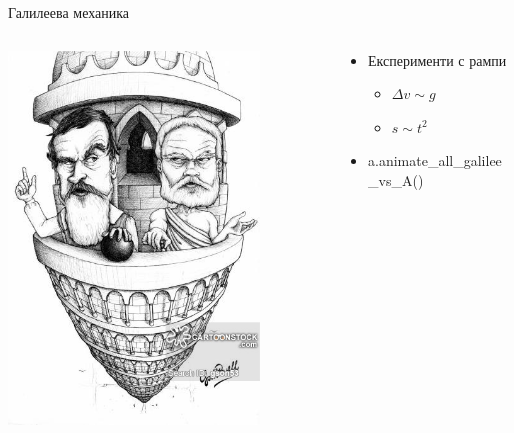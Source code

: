 \documentclass[10pt,a4paper]{beamer}
\begin{document}
        \begin{frame}{ Галилеева механика }
            \begin{columns}
                \begin{column}{0.5\textwidth}
                    \includegraphics[width=0.8\textwidth]{images/galilei_aristotle_piza.jpg}
                \end{column}
                \begin{column}{0.5\textwidth}
                    \begin{itemize}
                        \item Експерименти с рампи \begin{itemize}
                            \item $ \Delta v \sim g $
                            \item $ s \sim t^2 $
                        \end{itemize}
                        \item a.animate\_all\_galilee\_vs\_A()
                    \end{itemize}
                \end{column}
            \end{columns}
        \end{frame}
    
\end{document}
